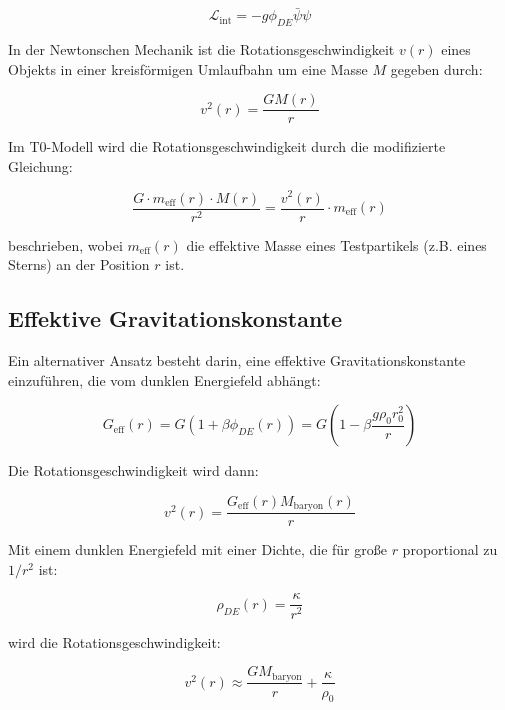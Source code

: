 \documentclass[a4paper,12pt]{article}
\theoremstyle{definition}
\theoremstyle{remark}
\begin{document}
	\begin{equation}
		\mathcal{L}_{\text{int}} = -g \phi_{DE} \bar{\psi}\psi
	\end{equation}
	
	In der Newtonschen Mechanik ist die Rotationsgeschwindigkeit $v(r)$ eines Objekts in einer kreisförmigen Umlaufbahn um eine Masse $M$ gegeben durch:
	
	\begin{equation}
		v^2(r) = \frac{GM(r)}{r}
	\end{equation}
	
	Im T0-Modell wird die Rotationsgeschwindigkeit durch die modifizierte Gleichung:
	
	\begin{equation}
		\frac{G \cdot m_{\text{eff}}(r) \cdot M(r)}{r^2} = \frac{v^2(r)}{r} \cdot m_{\text{eff}}(r)
	\end{equation}
	
	beschrieben, wobei $m_{\text{eff}}(r)$ die effektive Masse eines Testpartikels (z.B. eines Sterns) an der Position $r$ ist.
	
	\subsection{Effektive Gravitationskonstante}
	
	Ein alternativer Ansatz besteht darin, eine effektive Gravitationskonstante einzuführen, die vom dunklen Energiefeld abhängt:
	
	\begin{equation}
		G_{\text{eff}}(r) = G\left(1 + \beta\phi_{DE}(r)\right) = G\left(1 - \beta\frac{g\rho_0 r_0^2}{r}\right)
	\end{equation}
	
	Die Rotationsgeschwindigkeit wird dann:
	
	\begin{equation}
		v^2(r) = \frac{G_{\text{eff}}(r)M_{\text{baryon}}(r)}{r}
	\end{equation}
	
	Mit einem dunklen Energiefeld mit einer Dichte, die für große $r$ proportional zu $1/r^2$ ist:
	
	\begin{equation}
		\rho_{DE}(r) = \frac{\kappa}{r^2}
	\end{equation}
	
	wird die Rotationsgeschwindigkeit:
	
	\begin{equation}
		v^2(r) \approx \frac{GM_{\text{baryon}}}{r} + \frac{\kappa}{\rho_0}
	\end{equation}
	
\end{document}
